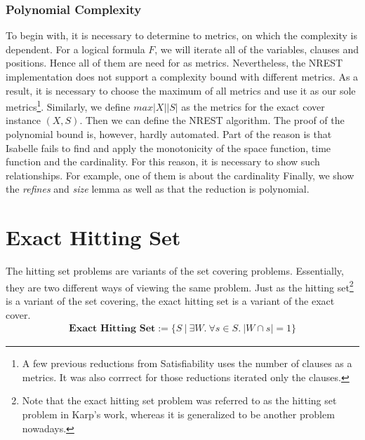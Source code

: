 \subsubsection{Polynomial Complexity}
To begin with, it is necessary to determine to metrics, on which the complexity is dependent. For 
a logical formula $F$, we will iterate all of the variables, clauses and positions. Hence all of them are need for as metrics. 
Nevertheless, the NREST implementation does not support a complexity bound with different metrics. As a result, it is necessary to 
choose the maximum of all metrics and use it as our sole metrics\footnote{A few previous reductions from Satisfiability uses the number of clauses 
as a metrics. It was also corrrect for those reductions iterated only the clauses.}. Similarly, we define $max |X| |S|$ as the metrics 
for the exact cover instance $(X, S)$. Then we can define the NREST algorithm.
The proof of the polynomial bound is, however, hardly automated. Part of the reason is that Isabelle fails to find and apply the monotonicity 
of the space function, time function and the cardinality. For this reason, it is necessary to show such relationships. For example, one of them is about the 
cardinality
Finally, we show the \textit{refines} and \textit{size} lemma as well as that the reduction is polynomial.

\section{Exact Hitting Set}
The hitting set problems are variants of the set covering problems. Essentially, they are two different ways 
of viewing the same problem. Just as the hitting set\footnote{Note that the exact hitting set problem was referred to as the hitting set problem in Karp's work, whereas 
it is generalized to be another problem nowadays.} is a variant of the set covering, the exact hitting set is 
a variant of the exact cover. 
\begin{align*}
   \textbf{Exact Hitting Set} := \{S\ |\ \exists W.\ \forall s \in S.\ |W \cap s| = 1\}
\end{align*}
 

